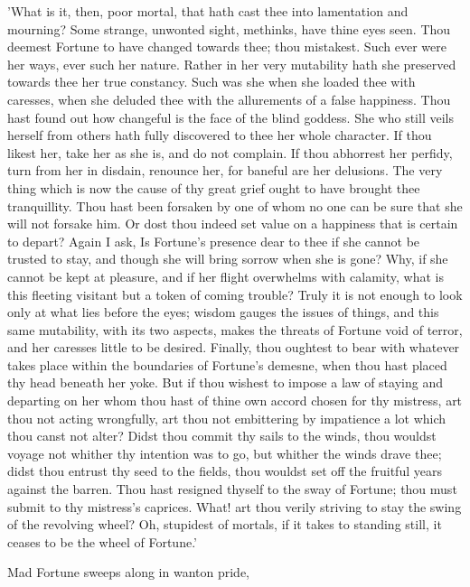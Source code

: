 'What is it, then, poor mortal, that hath cast thee into lamentation and
mourning? Some strange, unwonted sight, methinks, have thine eyes seen.
Thou deemest Fortune to have changed towards thee; thou mistakest. Such
ever were her ways, ever such her nature. Rather in her very mutability
hath she preserved towards thee her true constancy. Such was she when
she loaded thee with caresses, when she deluded thee with the
allurements of a false happiness. Thou hast found out how changeful is
the face of the blind goddess. She who still veils herself from others
hath fully discovered to thee her whole character. If thou likest her,
take her as she is, and do not complain. If thou abhorrest her perfidy,
turn from her in disdain, renounce her, for baneful are her delusions.
The very thing which is now the cause of thy great grief ought to have
brought thee tranquillity. Thou hast been forsaken by one of whom no one
can be sure that she will not forsake him. Or dost thou indeed set value
on a happiness that is certain to depart? Again I ask, Is Fortune's
presence dear to thee if she cannot be trusted to stay, and though she
will bring sorrow when she is gone? Why, if she cannot be kept at
pleasure, and if her flight overwhelms with calamity, what is this
fleeting visitant but a token of coming trouble? Truly it is not enough
to look only at what lies before the eyes; wisdom gauges the issues of
things, and this same mutability, with its two aspects, makes the
threats of Fortune void of terror, and her caresses little to be
desired. Finally, thou oughtest to bear with whatever takes place within
the boundaries of Fortune's demesne, when thou hast placed thy head
beneath her yoke. But if thou wishest to impose a law of staying and
departing on her whom thou hast of thine own accord chosen for thy
mistress, art thou not acting wrongfully, art thou not embittering by
impatience a lot which thou canst not alter? Didst thou commit thy sails
to the winds, thou wouldst voyage not whither thy intention was to go,
but whither the winds drave thee; didst thou entrust thy seed to the
fields, thou wouldst set off the fruitful years against the barren. Thou
hast resigned thyself to the sway of Fortune; thou must submit to thy
mistress's caprices. What! art thou verily striving to stay the swing
of the revolving wheel? Oh, stupidest of mortals, if it takes to
standing still, it ceases to be the wheel of Fortune.'


Mad Fortune sweeps along in wanton pride,

